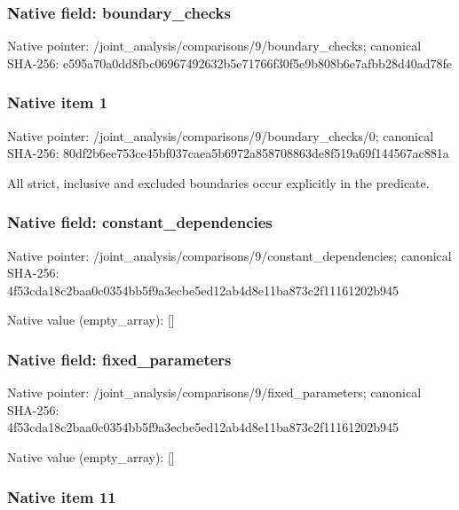 \documentclass[10pt,a4paper]{article}
\begin{document}
\subsubsection{Native field: boundary\_checks}


Native pointer: /joint\_analysis/comparis\allowbreak{}ons/9/boundary\_checks; canonical SHA-256: e595a70a0dd8fbc069674926\allowbreak{}32b5e71766f30f5e9b808b6e\allowbreak{}7afbb28d40ad78fe



\subsubsection{Native item 1}


Native pointer: /joint\_analysis/comparis\allowbreak{}ons/9/boundary\_checks/0; canonical SHA-256: 80df2b6ee753ce45bf037cae\allowbreak{}a5b6972a858708863de8f519\allowbreak{}a69f144567ac881a


All strict, inclusive and excluded boundaries occur explicitly in the predicate.


\subsubsection{Native field: constant\_dependencies}


Native pointer: /joint\_analysis/comparis\allowbreak{}ons/9/constant\_dependenc\allowbreak{}ies; canonical SHA-256: 4f53cda18c2baa0c0354bb5f\allowbreak{}9a3ecbe5ed12ab4d8e11ba87\allowbreak{}3c2f11161202b945



Native value (empty\_array): []



\subsubsection{Native field: fixed\_parameters}


Native pointer: /joint\_analysis/comparis\allowbreak{}ons/9/fixed\_parameters; canonical SHA-256: 4f53cda18c2baa0c0354bb5f\allowbreak{}9a3ecbe5ed12ab4d8e11ba87\allowbreak{}3c2f11161202b945



Native value (empty\_array): []



\subsubsection{Native item 11}
\end{document}
